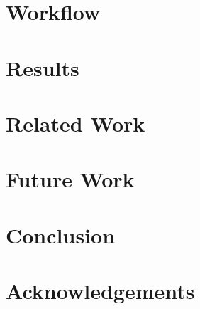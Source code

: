 \documentclass[12pt]{article}
\begin{document}
\section{Workflow} \label{sec:wf}

\section{Results} \label{sec:results}
\section{Related Work} \label{sec:related}
\section{Future Work} \label{sec:future}
\section{Conclusion} \label{sec:con}
\section{Acknowledgements} \label{sec:ack}

\label{'LastPage'}
\end{document}
